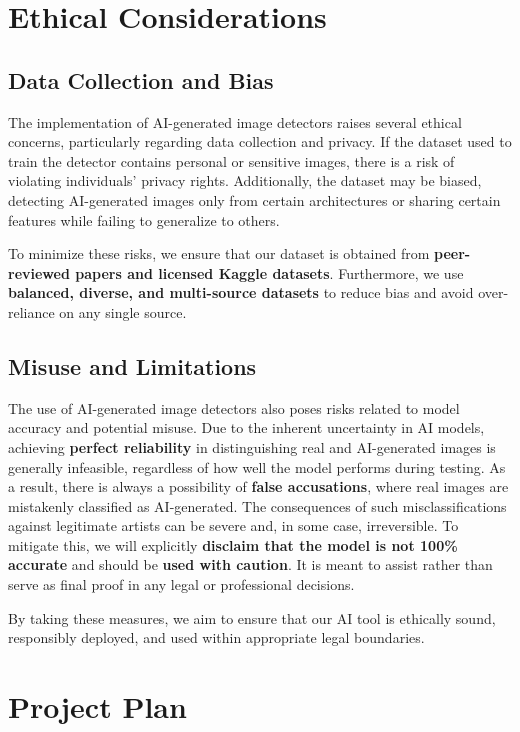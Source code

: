 \documentclass{article} %
\begin{document}
\section{Ethical Considerations}
\label{ethical}

\subsection{Data Collection and Bias}
The implementation of AI-generated image detectors raises several ethical concerns, particularly regarding data collection and privacy. If the dataset used to train the detector contains personal or sensitive images, there is a risk of violating individuals' privacy rights. Additionally, the dataset may be biased, detecting AI-generated images only from certain architectures or sharing certain features while failing to generalize to others.

To minimize these risks, we ensure that our dataset is obtained from \textbf{peer-reviewed papers and licensed Kaggle datasets}. Furthermore, we use \textbf{balanced, diverse, and multi-source datasets} to reduce bias and avoid over-reliance on any single source.

\subsection{Misuse and Limitations}
The use of AI-generated image detectors also poses risks related to model accuracy and potential misuse. Due to the inherent uncertainty in AI models, achieving \textbf{perfect reliability} in distinguishing real and AI-generated images is generally infeasible, regardless of how well the model performs during testing. As a result, there is always a possibility of \textbf{false accusations}, where real images are mistakenly classified as AI-generated. The consequences of such misclassifications against legitimate artists can be severe and, in some case, irreversible. To mitigate this, we will explicitly \textbf{disclaim that the model is not 100\% accurate} and should be \textbf{used with caution}. It is meant to assist rather than serve as final proof in any legal or professional decisions.

By taking these measures, we aim to ensure that our AI tool is ethically sound, responsibly deployed, and used within appropriate legal boundaries.


\section{Project Plan}
\label{plan}
\end{document}
